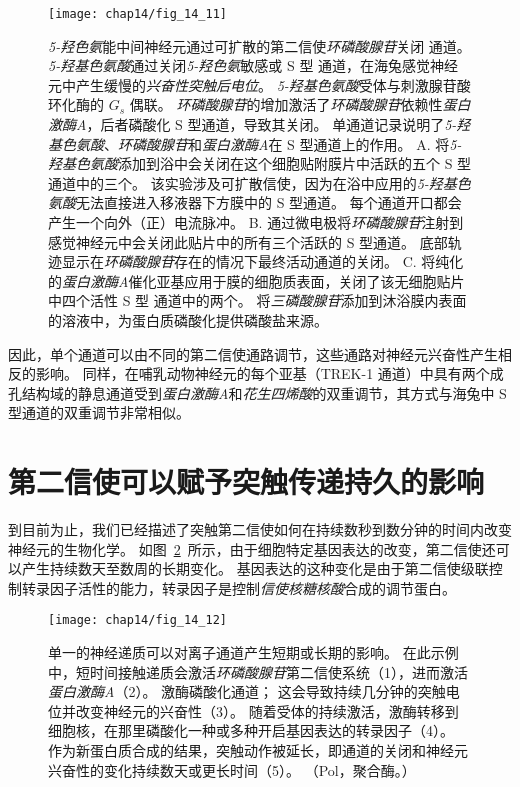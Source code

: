 \begin{figure}[htbp]
	\centering
	\texttt{[image: chap14/fig\_14\_11]}
	\caption{\textit{5-羟色氨}能中间神经元通过可扩散的第二信使\textit{环磷酸腺苷}关闭  通道。
		\textit{5-羟基色氨酸}通过关闭\textit{5-羟色氨}敏感或 S 型 通道，在海兔感觉神经元中产生缓慢的\textit{兴奋性突触后电位}。
		\textit{5-羟基色氨酸}受体与刺激腺苷酸环化酶的 $ G_s $ 偶联。
		\textit{环磷酸腺苷}的增加激活了\textit{环磷酸腺苷}依赖性\textit{蛋白激酶A}，后者磷酸化 S 型通道，导致其关闭。
		单通道记录说明了\textit{5-羟基色氨酸}、\textit{环磷酸腺苷}和\textit{蛋白激酶A}在 S 型通道上的作用。
		A. 将\textit{5-羟基色氨酸}添加到浴中会关闭在这个细胞贴附膜片中活跃的五个 S 型  通道中的三个。
		该实验涉及可扩散信使，因为在浴中应用的\textit{5-羟基色氨酸}无法直接进入移液器下方膜中的 S 型通道。
		每个通道开口都会产生一个向外（正）电流脉冲\cite{siegelbaum1982serotonin}。
		B. 通过微电极将\textit{环磷酸腺苷}注射到感觉神经元中会关闭此贴片中的所有三个活跃的 S 型通道。
		底部轨迹显示在\textit{环磷酸腺苷}存在的情况下最终活动通道的关闭\cite{siegelbaum1982serotonin}。
		C. 将纯化的\textit{蛋白激酶A}催化亚基应用于膜的细胞质表面，关闭了该无细胞贴片中四个活性 S 型  通道中的两个。
		将\textit{三磷酸腺苷}添加到沐浴膜内表面的溶液中，为蛋白质磷酸化提供磷酸盐来源\cite{shuster1985cyclic}。}
	\label{fig:14_11}
\end{figure}


因此，单个通道可以由不同的第二信使通路调节，这些通路对神经元兴奋性产生相反的影响。
同样，在哺乳动物神经元的每个亚基（TREK-1 通道）中具有两个成孔结构域的静息通道受到\textit{蛋白激酶A}和\textit{花生四烯酸}的双重调节，其方式与海兔中 S 型通道的双重调节非常相似。



\section{第二信使可以赋予突触传递持久的影响}

到目前为止，我们已经描述了突触第二信使如何在持续数秒到数分钟的时间内改变神经元的生物化学。
如图~\ref{fig:14_12}~所示，由于细胞特定基因表达的改变，第二信使还可以产生持续数天至数周的长期变化。
基因表达的这种变化是由于第二信使级联控制转录因子活性的能力，转录因子是控制\textit{信使核糖核酸}合成的调节蛋白。


\begin{figure}[htbp]
	\centering
	\texttt{[image: chap14/fig\_14\_12]}
	\caption{单一的神经递质可以对离子通道产生短期或长期的影响。
		在此示例中，短时间接触递质会激活\textit{环磷酸腺苷}第二信使系统（1），进而激活\textit{蛋白激酶A}（2）。
		激酶磷酸化通道；
		这会导致持续几分钟的突触电位并改变神经元的兴奋性（3）。
		随着受体的持续激活，激酶转移到细胞核，在那里磷酸化一种或多种开启基因表达的转录因子（4）。
		作为新蛋白质合成的结果，突触动作被延长，即通道的关闭和神经元兴奋性的变化持续数天或更长时间（5）。
		（Pol，聚合酶。）}
	\label{fig:14_12}
\end{figure}


